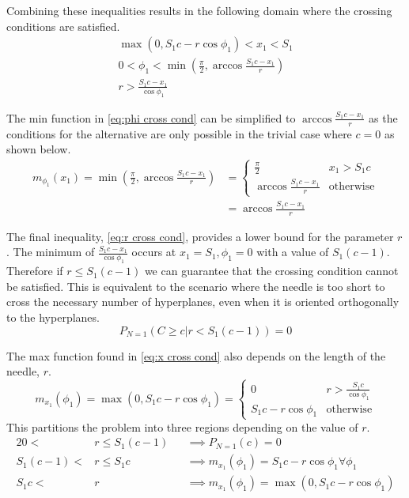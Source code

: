 \documentclass{article}
\begin{document}
Combining these inequalities results in the following domain where the crossing conditions are satisfied.
\begin{gather}
	\max(0, S_1c-r\cos\phi_1) < x_1 < S_1 \label{eq:x cross cond} \\
	0 < \phi_1 < \min(\frac{\pi}{2}, \arccos\frac{S_1c-x_1}{r}) \label{eq:phi cross cond} \\
	r > \frac{S_1c - x_1}{\cos{\phi_1}} \label{eq:r cross cond}
\end{gather}

The min function in \ref{eq:phi cross cond} can be simplified to $\arccos\frac{S_1c-x_1}{r}$ as the conditions for the alternative are
only possible in the trivial case where $c=0$ as shown below.
\begin{align}
	m_{\phi_1}(x_1) = \min(\frac{\pi}{2}, \arccos\frac{S_1c-x_1}{r}) &= \begin{cases}
		\frac{\pi}{2} & x_1>S_1c \\
		\arccos\frac{S_1c-x_1}{r} & \text{otherwise}
	\end{cases} \\
	&= \arccos\frac{S_1c-x_1}{r} 
\end{align}

The final inequality, \ref{eq:r cross cond}, provides a lower bound for the parameter $r$. The minimum of $\frac{S_1c - x_1}{\cos{\phi_1}}$
occurs at $x_1=S_1, \phi_1=0$ with a value of $S_1(c-1)$. Therefore if $r\le S_1(c-1)$ we can guarantee that the crossing condition
cannot be satisfied. This is equivalent to the scenario where the needle is too short to cross the necessary number of hyperplanes, even when it is oriented
orthogonally to the hyperplanes.
\begin{equation}
	P_{N=1}(C\ge c|r<S_1(c-1)) = 0
\end{equation}

The max function found in \ref{eq:x cross cond} also depends on the length of the needle, $r$. 
\begin{equation}
	m_{x_1}(\phi_1) = \max(0, S_1c-r\cos\phi_1) = \begin{cases}
		0 & r > \frac{S_1c}{\cos\phi_1} \\
		S_1c-r\cos\phi_1 & \text{otherwise}
	\end{cases}
\end{equation}
This partitions the problem into three regions depending on the value of $r$. 
\begin{alignat}{2}
	0 < &r \le S_1(c-1) &&\implies P_{N=1}(c) = 0 \\
	S_1(c-1) < &r \le S_1c &&\implies m_{x_1}(\phi_1) = S_1c-r\cos\phi_1 \forall \phi_1 \label{eq:short needle condition}\\
	S_1c < &r &&\implies m_{x_1}(\phi_1) = \max(0, S_1c -r\cos\phi_1) \label{eq:long needle condition}
\end{alignat}
\end{document}
